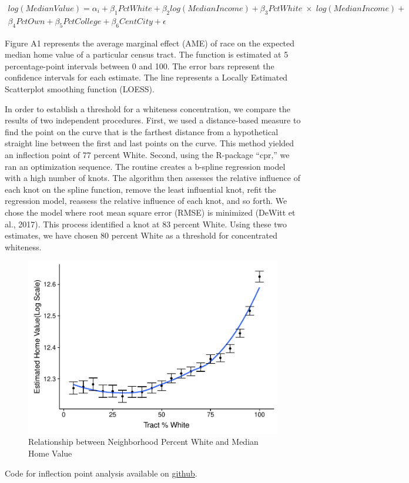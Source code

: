 \documentclass[11pt,]{article}
\begin{document}
\[
\begin{split}
log(MedianValue) = \alpha_i + \beta_1PctWhite + \beta_2log(MedianIncome) + \beta_3 PctWhite \; \times \; log(MedianIncome) + \\ \beta_4PctOwn + \beta_5PctCollege + \beta_6CentCity + \epsilon 
\end{split}
\]

Figure A1 represents the average marginal effect (AME) of race on the
expected median home value of a particular census tract. The function is
estimated at 5 percentage-point intervals between 0 and 100. The error
bars represent the confidence intervals for each estimate. The line
represents a Locally Estimated Scatterplot smoothing function (LOESS).

In order to establish a threshold for a whiteness concentration, we
compare the results of two independent procedures. First, we used a
distance-based measure to find the point on the curve that is the
farthest distance from a hypothetical straight line between the first
and last points on the curve. This method yielded an inflection point of
77 percent White. Second, using the R-package ``cpr,'' we ran an
optimization sequence. The routine creates a b-spline regression model
with a high number of knots. The algorithm then assesses the relative
influence of each knot on the spline function, remove the least
influential knot, refit the regression model, reassess the relative
influence of each knot, and so forth. We chose the model where root mean
square error (RMSE) is minimized (DeWitt et al., 2017). This process
identified a knot at 83 percent White. Using these two estimates, we
have chosen 80 percent White as a threshold for concentrated whiteness.

\begin{figure}
\centering
\includegraphics{GDW-RCAA-2019_files/figure-latex/figa1-1.pdf}
\caption{Relationship between Neighborhood Percent White and Median Home
Value}
\end{figure}

Code for inflection point analysis available on
\href{https://github.com/tdamiano}{github}.
\newpage
\singlespacing
\printbibliography
\end{document}
